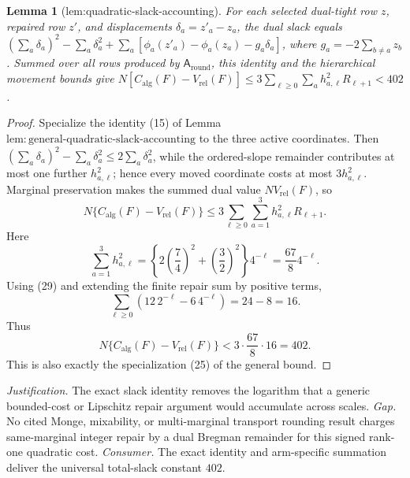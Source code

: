 \documentclass{article}
\newtheorem{lemma}{Lemma}
\begin{document}
\begin{lemma}[lem:quadratic-slack-accounting]\label{lem:quadratic-slack-accounting}
For each selected dual-tight row \(z\), repaired row \(z'\), and displacements \(\delta_a=z'_a-z_a\), the dual slack equals \((\sum_a\delta_a)^2-\sum_a\delta_a^2+\sum_a[\phi_a(z'_a)-\phi_a(z_a)-g_a\delta_a]\), where \(g_a=-2\sum_{b\ne a}z_b\).  Summed over all rows produced by \(\mathsf A_{\mathrm{round}}\), this identity and the hierarchical movement bounds give \(N[C_{\mathrm{alg}}(F)-V_{\mathrm{rel}}(F)]\le3\sum_{\ell\ge0}\sum_a h_{a,\ell}^2R_{\ell+1}<402\).
\end{lemma}
\begin{proof}
Specialize the identity (15) of Lemma \(\mathrm{lem{:}general\mbox{-}quadratic\mbox{-}slack\mbox{-}accounting}\) to the three active coordinates.  Then \((\sum_a\delta_a)^2-\sum_a\delta_a^2\le2\sum_a\delta_a^2\), while the ordered-slope remainder contributes at most one further \(h_{a,\ell}^2\); hence every moved coordinate costs at most \(3h_{a,\ell}^2\).  Marginal preservation makes the summed dual value \(NV_{\mathrm{rel}}(F)\), so
\[
 N\{C_{\mathrm{alg}}(F)-V_{\mathrm{rel}}(F)\}
 \le3\sum_{\ell\ge0}\sum_{a=1}^3h_{a,\ell}^2R_{\ell+1}. \tag{30}
\]
Here
\[
 \sum_{a=1}^3h_{a,\ell}^2
 =\left\{2\left(\frac74\right)^2+\left(\frac32\right)^2\right\}4^{-\ell}
 =\frac{67}{8}4^{-\ell}. \tag{31}
\]
Using (29) and extending the finite repair sum by positive terms,
\[
 \sum_{\ell\ge0}(12\,2^{-\ell}-6\,4^{-\ell})=24-8=16. \tag{32}
\]
Thus
\[
 N\{C_{\mathrm{alg}}(F)-V_{\mathrm{rel}}(F)\}
 <3\cdot\frac{67}{8}\cdot16=402. \tag{33}
\]
This is also exactly the specialization (25) of the general bound.
\end{proof}
\par\smallskip\noindent \textit{Justification.} The exact slack identity removes the logarithm that a generic bounded-cost or Lipschitz repair argument would accumulate across scales. \textit{Gap.} No cited Monge, mixability, or multi-marginal transport rounding result charges same-marginal integer repair by a dual Bregman remainder for this signed rank-one quadratic cost. \textit{Consumer.} The exact identity and arm-specific summation deliver the universal total-slack constant \(402\).
\end{document}
